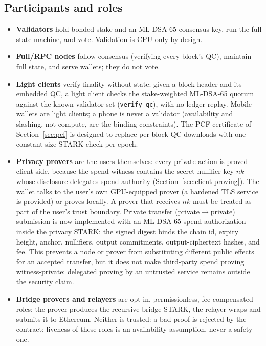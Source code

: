 \documentclass[11pt]{article}
\newcommand{\code}[1]{\texttt{#1}}
\newcommand{\mldsa}{ML\mbox{-}DSA\mbox{-}65}
\theoremstyle{plain}
\theoremstyle{definition}
\theoremstyle{remark}
\begin{document}
\subsection{Participants and roles}
\label{sec:roles}

\begin{itemize}[leftmargin=1.6em]
\item \textbf{Validators} hold bonded stake and an \mldsa{} consensus key,
  run the full state machine, and vote. Validation is CPU-only by design.
\item \textbf{Full/RPC nodes} follow consensus (verifying every block's QC),
  maintain full state, and serve wallets; they do not vote.
\item \textbf{Light clients} verify finality without state: given a block
  header and its embedded QC, a light client checks the stake-weighted
  \mldsa{} quorum against the known validator set
  (\code{verify\_qc}), with no ledger replay. Mobile wallets are light
  clients; a phone is never a validator (availability and slashing, not
  compute, are the binding constraints). The PCF certificate of
  Section~\ref{sec:pcf} is designed to replace per-block QC downloads with
  one constant-size STARK check per epoch.
\item \textbf{Privacy provers} are the users themselves: every private action
  is proved client-side, because the spend witness contains the secret
  nullifier key $\mathit{nk}$ whose disclosure delegates spend authority
  (Section~\ref{sec:client-proving}). The wallet talks to the user's own
  GPU-equipped prover (a hardened TLS service is provided) or proves locally.
  A prover that receives $\mathit{nk}$ must be treated as part of the user's
  trust boundary. Private transfer (private$\to$private) submission is now
  implemented with an \mldsa{} spend authorization inside the privacy STARK:
  the signed digest binds the chain id, expiry height, anchor, nullifiers,
  output commitments, output-ciphertext hashes, and fee. This prevents a node
  or prover from substituting different public effects for an accepted
  transfer, but it does not make third-party spend proving witness-private:
  delegated proving by an untrusted service remains outside the security
  claim.
\item \textbf{Bridge provers and relayers} are opt-in, permissionless,
  fee-compensated roles: the prover produces the recursive bridge STARK, the
  relayer wraps and submits it to Ethereum. Neither is trusted: a bad proof
  is rejected by the contract; liveness of these roles is an availability
  assumption, never a safety one.
\end{itemize}
\end{document}
